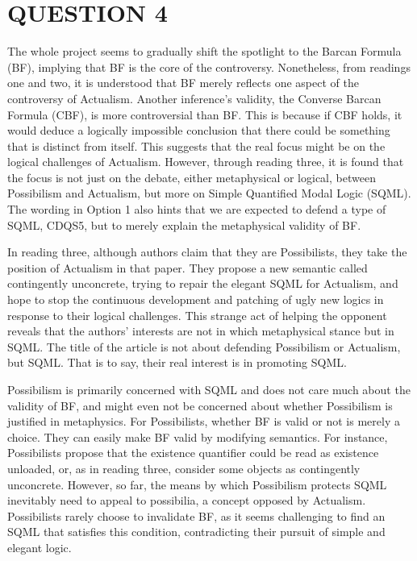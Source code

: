 \section*{QUESTION 4}
The whole project seems to gradually shift the spotlight to the Barcan Formula (BF), implying that BF is the core of the controversy. Nonetheless, from readings one and two, it is understood that BF merely reflects one aspect of the controversy of Actualism. Another inference's validity, the Converse Barcan Formula (CBF), is more controversial than BF. This is because if CBF holds, it would deduce a logically impossible conclusion that there could be something that is distinct from itself. This suggests that the real focus might be on the logical challenges of Actualism. However, through reading three, it is found that the focus is not just on the debate, either metaphysical or logical, between Possibilism and Actualism, but more on Simple Quantified Modal Logic (SQML). The wording in Option 1 also hints that we are expected to defend a type of SQML, CDQS5, but to merely explain the metaphysical validity of BF.

In reading three, although authors claim that they are Possibilists, they take the position of Actualism in that paper. They propose a new semantic called contingently unconcrete, trying to repair the elegant SQML for Actualism, and hope to stop the continuous development and patching of ugly new logics in response to their logical challenges. This strange act of helping the opponent reveals that the authors' interests are not in which metaphysical stance but in SQML. The title of the article is not about defending Possibilism or Actualism, but SQML. That is to say, their real interest is in promoting SQML.

Possibilism is primarily concerned with SQML and does not care much about the validity of BF, and might even not be concerned about whether Possibilism is justified in metaphysics. For Possibilists, whether BF is valid or not is merely a choice. They can easily make BF valid by modifying semantics. For instance, Possibilists propose that the existence quantifier could be read as existence unloaded, or, as in reading three, consider some objects as contingently unconcrete. However, so far, the means by which Possibilism protects SQML inevitably need to appeal to possibilia, a concept opposed by Actualism. Possibilists rarely choose to invalidate BF, as it seems challenging to find an SQML that satisfies this condition, contradicting their pursuit of simple and elegant logic.

